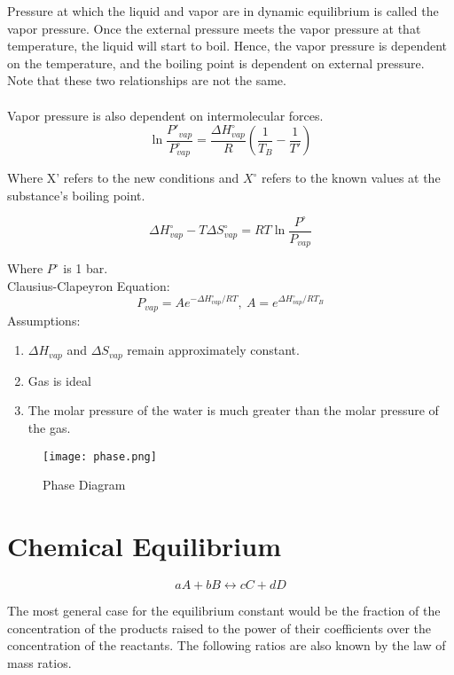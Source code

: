 \documentclass{article}
\begin{document}
Pressure at which the liquid and vapor are in dynamic equilibrium is called the vapor pressure. Once the external pressure meets the vapor pressure at that temperature, the liquid will start to boil. Hence, the vapor pressure is dependent on the temperature, and the boiling point is dependent on external pressure. Note that these two relationships are not the same. \\
\\
Vapor pressure is also dependent on intermolecular forces.\\

\[
\ln{\frac{P'_{vap}}{P^{\circ}_{vap}}} = \frac{\Delta H^{\circ}_{vap}}{R} (\frac{1}{T_B}-\frac{1}{T'})
\]

\begin{center}
Where X' refers to the new conditions and $X^{\circ}$ refers to the known values at the substance's boiling point.
\end{center}

\[
\Delta H^{\circ}_{vap} - T \Delta S^{\circ}_{vap} = RT \ln \frac{P^{\circ}}{P_{vap}}
\]

Where $P^{\circ}$ is 1 bar.\\


Clausius-Clapeyron Equation:
\[
P_{vap} = Ae^{-\Delta H^{\circ}_{vap}/RT},\ A=e^{\Delta H^{\circ}_{vap}/RT_B}
\]
Assumptions: 
\begin{enumerate}
\item$\Delta H_{vap}$ and $\Delta S_{vap}$ remain approximately constant.
\item Gas is ideal
\item The molar pressure of the water is much greater than the molar pressure of the gas. 
\end{enumerate}

\begin{figure}[hbt!]
\centering
\texttt{[image: phase.png]}
\caption{Phase Diagram}
\end{figure}

\section{Chemical Equilibrium}

\[
a A + b B \leftrightarrow c C + d D
\]


The most general case for the equilibrium constant would be the fraction of the concentration of the products raised to the power of their coefficients over the concentration of the reactants. The following ratios are also known by the law of mass ratios.
\end{document}
